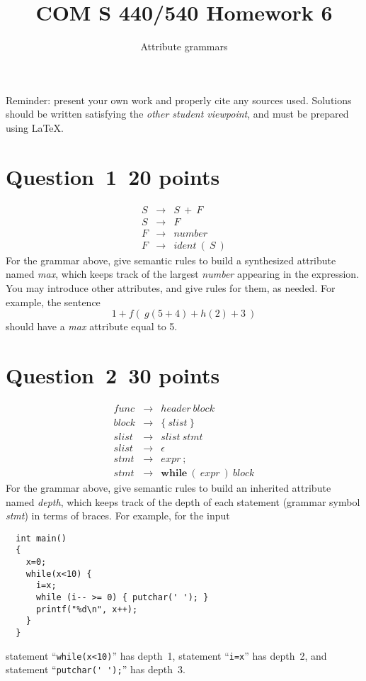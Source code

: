 \documentclass[10pt]{article}
\title{COM S 440/540 Homework 6}
\date{}
\author{Attribute grammars}
\renewcommand{\thepage}{~}
\begin{document}
\maketitle

\noindent
Reminder: present your own work and properly cite any sources used.
Solutions should be written satisfying the \emph{other student viewpoint},
and must be prepared using \LaTeX.
\renewcommand{\thepage}{~}
\section*{Question~1~\hfill 20 points}

\begin{eqnarray}
  S & \rightarrow & S ~+~ F
\\
  S & \rightarrow & F
\\
  F & \rightarrow & \mathit{number}
\\
  F & \rightarrow & \mathit{ident} ~(~ S ~)
\end{eqnarray}
For the grammar above, give semantic rules to build
a synthesized attribute named \emph{max}, 
which keeps track of the largest \emph{number} appearing in the expression.
You may introduce other attributes,
and give rules for them,
as needed.
For example, the sentence
\[
1 + f(~g(5+4) + h(2) + 3~)
\]
should have a \emph{max} attribute equal to 5.

\section*{Question~2~\hfill 30 points}

\begin{eqnarray}
  \mathit{func} & \rightarrow & \mathit{header} ~ \mathit{block}
\\
  \mathit{block} & \rightarrow & \{ ~ \mathit{slist} ~ \}
\\
  \mathit{slist} & \rightarrow & \mathit{slist} ~ \mathit{stmt}
\\
  \mathit{slist} & \rightarrow & \epsilon
\\
  \mathit{stmt} & \rightarrow & \mathit{expr} ~;
\\
  \mathit{stmt} & \rightarrow & \mathbf{while} ~ ( ~ \mathit{expr} ~ ) ~ \mathit{block}
\end{eqnarray}
For the grammar above, give semantic rules to build 
an inherited attribute named \emph{depth},
which keeps track of the depth of each statement
(grammar symbol \emph{stmt})
in terms of braces.
For example, for the input
\begin{verbatim}
  int main()
  {
    x=0;
    while(x<10) {
      i=x;
      while (i-- >= 0) { putchar(' '); }
      printf("%d\n", x++);
    }
  }
\end{verbatim}
statement ``\verb|while(x<10)|'' has depth~1,
statement ``\verb|i=x|'' has depth~2, 
and statement ``\verb|putchar(' ');|'' has depth~3.
\end{document}
